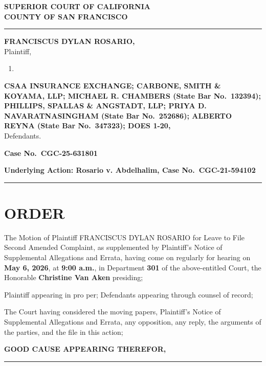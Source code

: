 \textbf{SUPERIOR COURT OF CALIFORNIA}\\
\textbf{COUNTY OF SAN FRANCISCO}

\begin{center}\rule{0.5\linewidth}{0.5pt}\end{center}

\textbf{FRANCISCUS DYLAN ROSARIO,}\\
Plaintiff,

\begin{enumerate}
\def\labelenumi{\alph{enumi}.}
\setcounter{enumi}{21}
\tightlist
\item
\end{enumerate}

\textbf{CSAA INSURANCE EXCHANGE; CARBONE, SMITH \& KOYAMA, LLP; MICHAEL R. CHAMBERS (State Bar No.~132394); PHILLIPS, SPALLAS \& ANGSTADT, LLP; PRIYA D. NAVARATNASINGHAM (State Bar No.~252686); ALBERTO REYNA (State Bar No.~347323); DOES 1-20,}\\
Defendants.

\textbf{Case No.~CGC-25-631801}

\textbf{Underlying Action: Rosario v. Abdelhalim, Case No.~CGC-21-594102}

\begin{center}\rule{0.5\linewidth}{0.5pt}\end{center}

\section{ORDER}\label{order}

The Motion of Plaintiff FRANCISCUS DYLAN ROSARIO for Leave to File Second Amended Complaint, as supplemented by Plaintiff's Notice of Supplemental Allegations and Errata, having come on regularly for hearing on \textbf{May 6, 2026}, at \textbf{9:00 a.m.}, in Department \textbf{301} of the above-entitled Court, the Honorable \textbf{Christine Van Aken} presiding;

Plaintiff appearing in pro per; Defendants appearing through counsel of record;

The Court having considered the moving papers, Plaintiff's Notice of Supplemental Allegations and Errata, any opposition, any reply, the arguments of the parties, and the file in this action;

\textbf{GOOD CAUSE APPEARING THEREFOR,}

\begin{center}\rule{0.5\linewidth}{0.5pt}\end{center}


